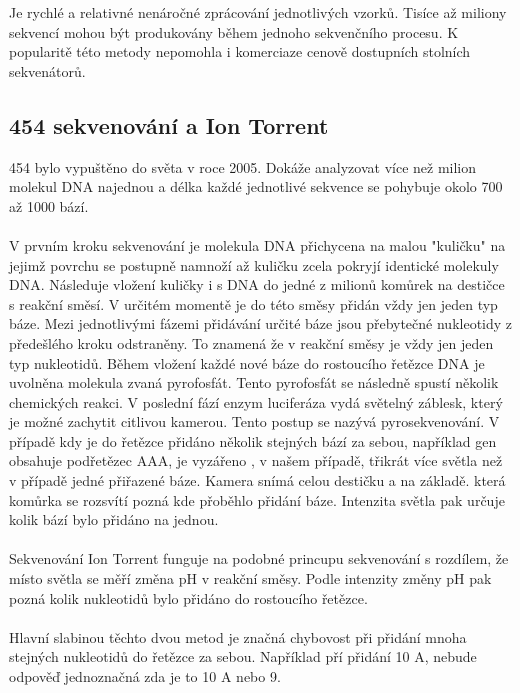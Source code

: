 \documentclass[czech,DP]{thesiskiv}
\begin{document}
Je rychlé a relativné nenáročné zprácování jednotlivých vzorků. Tisíce až miliony sekvencí mohou být produkovány během jednoho sekvenčního procesu. K popularitě této metody nepomohla i komerciaze cenově dostupních stolních sekvenátorů.


\subsection{454 sekvenování a Ion Torrent}
454 bylo vypuštěno do světa v roce 2005. Dokáže analyzovat více než milion molekul DNA najednou a délka každé jednotlivé sekvence se pohybuje okolo 700 až 1000 bází.
\\
\\
V prvním kroku sekvenování je molekula DNA přichycena na malou "kuličku" na jejimž povrchu se postupně namnoží až kuličku zcela pokryjí identické molekuly DNA. Následuje vložení kuličky i s DNA do jedné z milionů komůrek na destičce s reakční směsí. V určitém momentě je do této směsy přidán vždy jen jeden typ báze. Mezi jednotlivými fázemi přidávání určité báze jsou přebytečné nukleotidy z předešlého kroku odstraněny. To znamená že v reakční směsy je vždy jen jeden typ nukleotidů. Během vložení každé nové báze do rostoucího řetězce DNA je uvolněna molekula zvaná pyrofosfát.  Tento pyrofosfát se následně spustí několik chemických reakci. V poslední fází enzym luciferáza vydá světelný záblesk, který je možné zachytit citlivou kamerou.  Tento postup se nazývá pyrosekvenování. V případě kdy je do řetězce přidáno několik stejných bází za sebou, například gen obsahuje podřetězec AAA, je vyzářeno , v našem případě, třikrát více světla než v případě jedné přiřazené báze. Kamera snímá celou destičku a na základě. která komůrka se rozsvítí pozná kde přoběhlo přidání báze. Intenzita světla pak určuje kolik bází bylo přidáno na jednou. 
\\
\\
Sekvenování Ion Torrent funguje na podobné princupu sekvenování s rozdílem, že místo světla se měří změna pH v reakční směsy. Podle intenzity změny pH pak pozná kolik nukleotidů bylo přidáno do rostoucího řetězce.
\\
\\
Hlavní slabinou těchto dvou metod je značná chybovost při přidání mnoha stejných nukleotidů do řetězce za sebou. Například pří přidání 10 A, nebude odpověď jednoznačná zda je to 10 A nebo 9.
\end{document}
